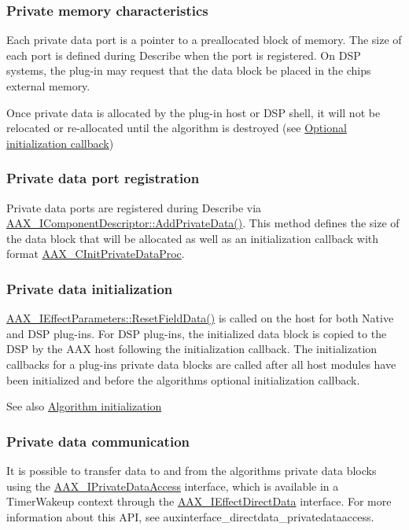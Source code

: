 \hypertarget{a00327_alg_pd_characteristics}{}\subsubsection{Private memory characteristics}\label{a00327_alg_pd_characteristics}
 Each private data port is a pointer to a preallocated block of memory. The size of each port is defined during Describe when the port is registered. On D\+S\+P systems, the plug-\/in may request that the data block be placed in the chip\textquotesingle{}s external memory.

 Once private data is allocated by the plug-\/in host or D\+S\+P shell, it will not be relocated or re-\/allocated until the algorithm is destroyed (see \hyperlink{a00327_alg_initialization_optional_callback}{Optional initialization callback})

\hypertarget{a00327_alg_pd_registration}{}\subsubsection{Private data port registration}\label{a00327_alg_pd_registration}
 Private data ports are registered during Describe via \hyperlink{a00088_a125949841a13e97ff93fa321f2050433}{A\+A\+X\+\_\+\+I\+Component\+Descriptor\+::\+Add\+Private\+Data()}. This method defines the size of the data block that will be allocated as well as an initialization callback with format \hyperlink{a00163_adfb5d89b9d957c541fc98fe42bc050c4}{A\+A\+X\+\_\+\+C\+Init\+Private\+Data\+Proc}.

\hypertarget{a00327_alg_pd_init}{}\subsubsection{Private data initialization}\label{a00327_alg_pd_init}
 \hyperlink{a00061_a6e87e40d42c7431e52ae5ebd4f631964}{A\+A\+X\+\_\+\+I\+Effect\+Parameters\+::\+Reset\+Field\+Data()} is called on the host for both Native and D\+S\+P plug-\/ins. For D\+S\+P plug-\/ins, the initialized data block is copied to the D\+S\+P by the A\+A\+X host following the initialization callback. The initialization callbacks for a plug-\/in\textquotesingle{}s private data blocks are called after all host modules have been initialized and before the algorithm\textquotesingle{}s optional initialization callback.

 \begin{DoxySeeAlso}{See also}
\hyperlink{a00327_alg_initialization}{Algorithm initialization}
\end{DoxySeeAlso}
\hypertarget{a00327_alg_pd_comm}{}\subsubsection{Private data communication}\label{a00327_alg_pd_comm}
 It is possible to transfer data to and from the algorithm\textquotesingle{}s private data blocks using the \hyperlink{a00111}{A\+A\+X\+\_\+\+I\+Private\+Data\+Access} interface, which is available in a Timer\+Wakeup context through the \hyperlink{a00097}{A\+A\+X\+\_\+\+I\+Effect\+Direct\+Data} interface. For more information about this A\+P\+I, see auxinterface\+\_\+directdata\+\_\+privatedataaccess.



